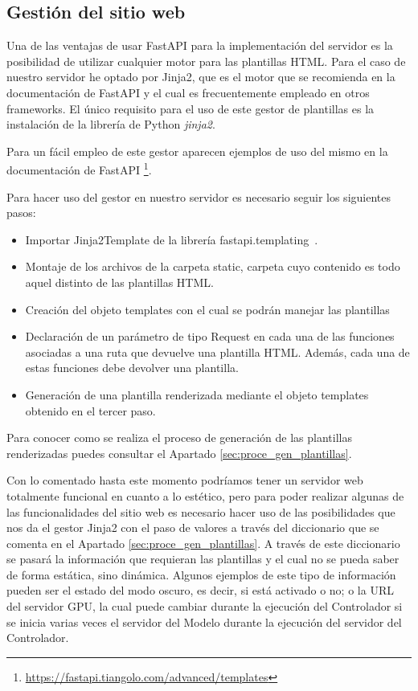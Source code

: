 \subsection{Gestión del sitio web} \label{subsec:gest_sitio_web}

Una de las ventajas de usar FastAPI para la implementación del servidor es la posibilidad de utilizar cualquier motor para las plantillas HTML. Para el caso de nuestro servidor he optado por Jinja2, que es el motor que se recomienda en la documentación de FastAPI y el cual es frecuentemente empleado en otros \glspl{framework}. El único requisito para el uso de este gestor de plantillas es la instalación de la librería de Python \textit{jinja2}.

Para un fácil empleo de este gestor aparecen ejemplos de uso del mismo en la documentación de FastAPI \footnote{\url{https://fastapi.tiangolo.com/advanced/templates}}.

Para hacer uso del gestor en nuestro servidor es necesario seguir los siguientes pasos:

\begin{itemize}
\item Importar Jinja2Template de la librería fastapi.templating\ .
\item Montaje de los archivos de la carpeta static, carpeta cuyo contenido es todo aquel distinto de las plantillas HTML.
\item Creación del objeto templates con el cual se podrán manejar las plantillas
\item Declaración de un parámetro de tipo Request en cada una de las funciones asociadas a una ruta que devuelve una plantilla HTML. Además, cada una de estas funciones debe devolver una plantilla.
\item Generación de una plantilla renderizada mediante el objeto templates obtenido en el tercer paso.
\end{itemize}

Para conocer como se realiza el proceso de generación de las plantillas renderizadas puedes consultar el Apartado \ref{sec:proce_gen_plantillas}.

Con lo comentado hasta este momento podríamos tener un servidor web totalmente funcional en cuanto a lo estético, pero para poder realizar algunas de las funcionalidades del sitio web es necesario hacer uso de las posibilidades que nos da el gestor Jinja2 con el paso de valores a través del diccionario que se comenta en el Apartado \ref{sec:proce_gen_plantillas}. A través de este diccionario se pasará la información que requieran las plantillas y el cual no se pueda saber de forma estática, sino dinámica. Algunos ejemplos de este tipo de información pueden ser el estado del modo oscuro, es decir, si está activado o no; o la URL del servidor GPU, la cual puede cambiar durante la ejecución del Controlador si se inicia varias veces el servidor del Modelo durante la ejecución del servidor del Controlador.

